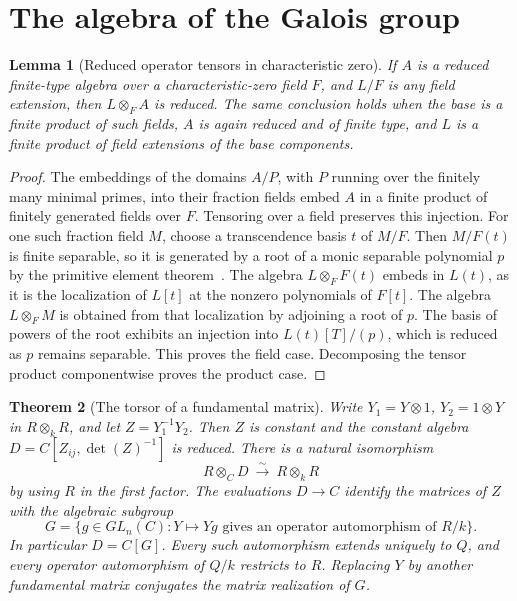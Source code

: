 \documentclass[11pt,oneside,openany]{book}
\newtheorem{theorem}{Theorem}[chapter]
\newtheorem{lemma}[theorem]{Lemma}
\theoremstyle{definition}
\theoremstyle{remark}
\begin{document}
\section{The algebra of the Galois group}

\begin{lemma}[Reduced operator tensors in characteristic zero]
\label{res:PV11}
If \(A\) is a reduced finite-type algebra over a characteristic-zero
field \(F\), and \(L/F\) is any field extension, then
\(L\otimes_F A\) is reduced. The same conclusion holds when the base
is a finite product of such fields, \(A\) is again reduced and
of finite type, and \(L\) is a finite product of field extensions
of the base components.
\end{lemma}

\begin{proof}
The embeddings of the domains \(A/P\), with \(P\) running over the
finitely many minimal primes, into their fraction fields embed \(A\)
in a finite product of finitely generated fields over \(F\).
Tensoring over a field preserves this injection. For one such
fraction field \(M\), choose a transcendence basis \(t\) of
\(M/F\). Then \(M/F(t)\) is finite separable, so it is generated
by a root of a monic separable polynomial \(p\) by the primitive
element theorem~\cite[Section 14.31, PDF p.~113]{mg-d07}. The algebra
\(L\otimes_F F(t)\) embeds in \(L(t)\), as it is the localization
of \(L[t]\) at the nonzero polynomials of \(F[t]\).
The algebra \(L\otimes_F M\) is obtained from that localization
by adjoining a root of \(p\). The basis of powers of the root
exhibits an injection into \(L(t)[T]/(p)\), which is reduced
as \(p\) remains separable. This proves the field case. Decomposing
the tensor product componentwise proves the product case.
\end{proof}

\begin{theorem}[The torsor of a fundamental matrix]
\label{res:PV12}
Write \(Y_1=Y\otimes1\), \(Y_2=1\otimes Y\) in \(R\otimes_k R\),
and let \(Z=Y_1^{-1}Y_2\). Then \(Z\) is constant and the
constant algebra \(D=C[Z_{ij},\det(Z)^{-1}]\) is reduced. There
is a natural isomorphism
\[
 R\otimes_C D \ \xrightarrow{\ \sim\ }\ R\otimes_k R
\]
by using \(R\) in the first factor. The evaluations \(D\to C\)
identify the matrices of \(Z\) with the algebraic subgroup
\[
 G=\{g\in GL_n(C):Y\mapsto Yg
                   \text{ gives an operator automorphism of }R/k\}.
\]
In particular \(D=C[G]\). Every such automorphism extends uniquely
to \(Q\), and every operator automorphism of \(Q/k\) restricts to
\(R\). Replacing \(Y\) by another fundamental matrix conjugates
the matrix realization of \(G\).
\end{theorem}
\end{document}
